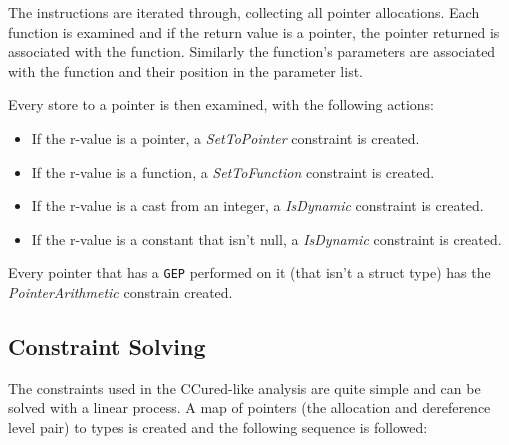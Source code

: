 The instructions are iterated through, collecting all pointer allocations.
Each function is examined and if the return value is a pointer, the pointer returned is associated with the function.
Similarly the function's parameters are associated with the function and their position in the parameter list.

Every store to a pointer is then examined, with the following actions:

\begin{itemize}
\item If the r-value is a pointer, a \textit{SetToPointer} constraint is created.
\item If the r-value is a function, a \textit{SetToFunction} constraint is created.
\item If the r-value is a cast from an integer, a \textit{IsDynamic} constraint is created.
\item If the r-value is a constant that isn't null, a \textit{IsDynamic} constraint is created.
\end{itemize}

Every pointer that has a \verb!GEP! performed on it (that isn't a struct type) has the \textit{PointerArithmetic} constrain created.

\subsection{Constraint Solving}

The constraints used in the CCured-like analysis are quite simple and can be solved with a linear process.
A map of pointers (the allocation and dereference level pair) to types is created and the following sequence is followed:

